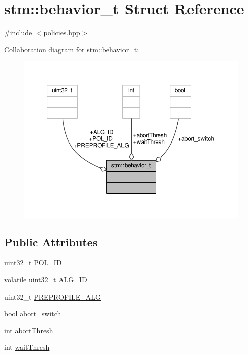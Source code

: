 \hypertarget{structstm_1_1behavior__t}{\section{stm\-:\-:behavior\-\_\-t Struct Reference}
\label{structstm_1_1behavior__t}
}


{\ttfamily \#include $<$policies.\-hpp$>$}



Collaboration diagram for stm\-:\-:behavior\-\_\-t\-:
\nopagebreak
\begin{figure}[H]
\begin{center}
\leavevmode
\includegraphics[width=350pt]{structstm_1_1behavior__t__coll__graph}
\end{center}
\end{figure}
\subsection*{Public Attributes}
\begin{DoxyCompactItemize}
\item 
uint32\-\_\-t \hyperlink{structstm_1_1behavior__t_aef57c4f5438b332ed2829a907101504f}{P\-O\-L\-\_\-\-I\-D}
\item 
volatile uint32\-\_\-t \hyperlink{structstm_1_1behavior__t_a52f3d6d903327aa9b96b4358c301b906}{A\-L\-G\-\_\-\-I\-D}
\item 
uint32\-\_\-t \hyperlink{structstm_1_1behavior__t_ab914d48d4a039a0b4b9dbbdd0f08462d}{P\-R\-E\-P\-R\-O\-F\-I\-L\-E\-\_\-\-A\-L\-G}
\item 
bool \hyperlink{structstm_1_1behavior__t_a246c606cffbe6e00ad47817cca8b44f2}{abort\-\_\-switch}
\item 
int \hyperlink{structstm_1_1behavior__t_ad54029ebe2d83e4ba76f1e011ed8f95e}{abort\-Thresh}
\item 
int \hyperlink{structstm_1_1behavior__t_a64fe29181a677b2617b5e954a78c33b8}{wait\-Thresh}
\end{DoxyCompactItemize}


